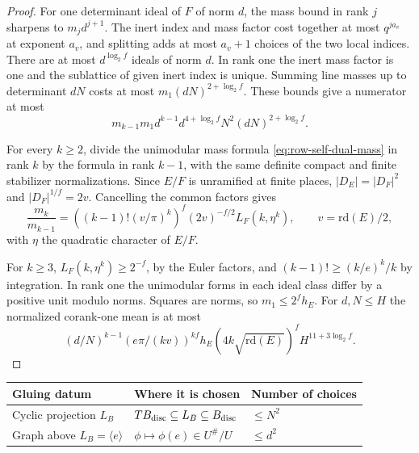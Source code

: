\begin{proof}
For one determinant ideal of \(F\) of norm \(d\),
the mass bound in rank \(j\) sharpens to \(m_j d^{j+1}\).
The inert index and mass factor cost together at most
\(q^{ja_v}\) at exponent \(a_v\), and splitting adds
at most \(a_v+1\) choices of the two local indices.
There are at most \(d^{\log_2 f}\) ideals of norm \(d\).
In rank one the inert mass factor is one and the sublattice
of given inert index is unique. Summing line masses up to
determinant \(dN\) costs at most \(m_1(dN)^{2+\log_2 f}\).
These bounds give a numerator at most
\[
 m_{k-1}m_1d^{k-1}d^{4+\log_2 f}N^2(dN)^{2+\log_2 f}.
\]

For every \(k\ge2\), divide the unimodular mass formula
\eqref{eq:row-self-dual-mass} in rank \(k\) by the formula in rank
\(k-1\), with the same definite compact and finite stabilizer
normalizations. Since \(E/F\) is unramified at finite places,
\(|D_E|=|D_F|^2\) and \(|D_F|^{1/f}=2v\). Cancelling the common factors gives
\begin{equation}\label{eq:adjacent-unimodular-genus-masses}
 \frac{m_k}{m_{k-1}}
 =((k-1)!(v/\pi)^k)^f(2v)^{-f/2}L_F(k,\eta^k),
 \qquad v=\mathrm{rd}(E)/2 ,
\end{equation}
with \(\eta\) the quadratic character of \(E/F\).

For \(k\geq3\), \(L_F(k,\eta^k)\geq2^{-f}\), by the
Euler factors, and \((k-1)!\geq(k/e)^k/k\) by integration.
In rank one the unimodular forms in each ideal class
differ by a positive unit modulo norms. Squares are norms,
so \(m_1\leq2^fh_E\). For \(d,N\leq H\) the normalized
corank-one mean is at most
\[
 (d/N)^{k-1}(e\pi/(kv))^{kf}
 h_E(4k\sqrt{\mathrm{rd}(E)})^f H^{11+3\log_2 f}.
\]

\end{proof}

\begin{construction}
\begin{tabular}{@{}lll@{}}\toprule
Gluing datum & Where it is chosen & Number of choices\\\midrule
Cyclic projection \(L_B\) &
\(T B_{\rm disc}\subseteq L_B\subseteq B_{\rm disc}\) & \(\le N^2\)\\
Graph above \(L_B=\langle e\rangle\) &
\(\phi\mapsto\phi(e)\in U^\#/U\) & \(\le d^2\)\\\bottomrule
\end{tabular}
\caption{The two choices in corank-one gluing. Each projected module admits at most \(d^2\) graph maps, so the product bound is \(N^2d^2\).}\label{fig:corank-one-gluing-data}
\end{construction}

